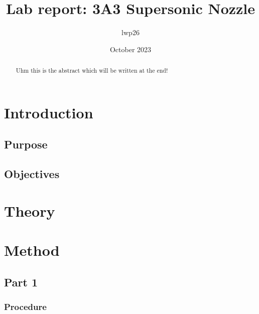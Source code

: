 \documentclass[8pt]{article}
\begin{document}

\title{Lab report: 3A3 Supersonic Nozzle}
\author{lwp26}
\date{October 2023}
\maketitle

\begin{abstract}
    \centering
    Uhm this is the abstract which will be written at the end!
\end{abstract}

\section{Introduction}

\subsection{Purpose}


\subsection{Objectives}

\section{Theory}


\section{Method}

\subsection{Part 1}

\subsubsection{Procedure}
\end{document}
